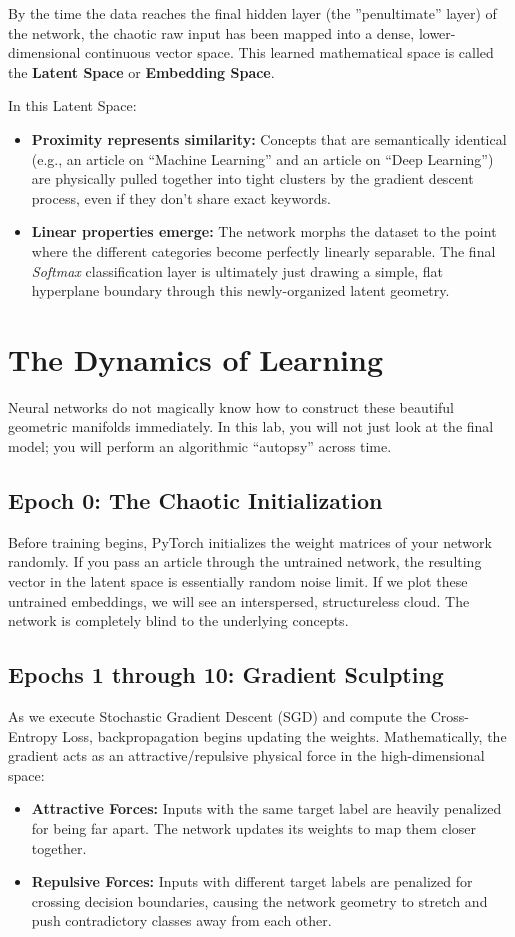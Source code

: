 \documentclass[11pt]{article}
\begin{document}
By the time the data reaches the final hidden layer (the ''penultimate'' layer) of the network, the chaotic raw input has been mapped into a dense, lower-dimensional continuous vector space. This learned mathematical space is called the \textbf{Latent Space} or \textbf{Embedding Space}.

In this Latent Space:
\begin{itemize}
    \item \textbf{Proximity represents similarity:} Concepts that are semantically identical (e.g., an article on ``Machine Learning'' and an article on ``Deep Learning'') are physically pulled together into tight clusters by the gradient descent process, even if they don't share exact keywords.
    \item \textbf{Linear properties emerge:} The network morphs the dataset to the point where the different categories become perfectly linearly separable. The final \textit{Softmax} classification layer is ultimately just drawing a simple, flat hyperplane boundary through this newly-organized latent geometry.
\end{itemize}

\section{The Dynamics of Learning}

Neural networks do not magically know how to construct these beautiful geometric manifolds immediately. In this lab, you will not just look at the final model; you will perform an algorithmic ``autopsy'' across time.

\subsection{Epoch 0: The Chaotic Initialization}
Before training begins, PyTorch initializes the weight matrices of your network randomly. If you pass an article through the untrained network, the resulting vector in the latent space is essentially random noise limit. If we plot these untrained embeddings, we will see an interspersed, structureless cloud. The network is completely blind to the underlying concepts.

\subsection{Epochs 1 through 10: Gradient Sculpting}
As we execute Stochastic Gradient Descent (SGD) and compute the Cross-Entropy Loss, backpropagation begins updating the weights. Mathematically, the gradient acts as an attractive/repulsive physical force in the high-dimensional space:
\begin{itemize}
    \item \textbf{Attractive Forces:} Inputs with the same target label are heavily penalized for being far apart. The network updates its weights to map them closer together.
    \item \textbf{Repulsive Forces:} Inputs with different target labels are penalized for crossing decision boundaries, causing the network geometry to stretch and push contradictory classes away from each other.
\end{itemize}
\end{document}
